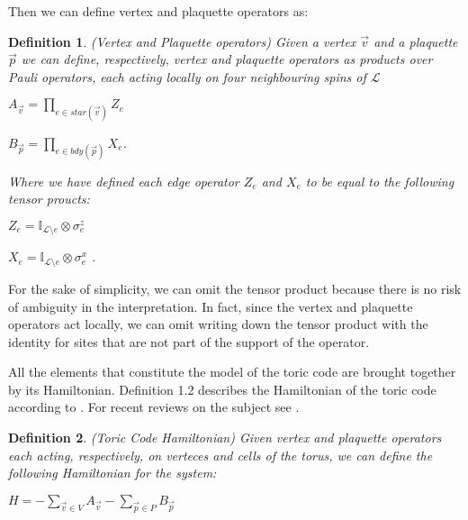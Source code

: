 \documentclass{Configuration_Files/PoliMi3i_thesis}
\newtheorem{definition}{Definition}[chapter]
\begin{document}
Then we can define vertex and plaquette operators as:

\begin{definition} (Vertex and Plaquette operators) Given a vertex $\vec{v}$ and a plaquette $\vec{p}$ we can define, respectively, vertex and plaquette operators as products over Pauli operators, each acting locally on four neighbouring spins of $\mathcal{L}$
	
\begin{center}
	$ A_{\vec{v}} = \prod_{e \in star(\vec{v})} Z_e $ 
	
	$ B_{\vec{p}} = \prod_{e \in bdy(\vec{p})} X_e $.
\end{center}

Where we have defined each edge operator $Z_e$ and $X_e$ to be equal to the following tensor proucts:

\begin{center}
	
	$Z_e = \mathbb{I}_{\mathcal{L} \setminus  e} \otimes \sigma^z_{e}$ 
	
	$X_e = \mathbb{I}_{\mathcal{L} \setminus  e} \otimes \sigma^x_{e} $ .
	
\end{center}
\end{definition}

For the sake of simplicity, we can omit the tensor product because there is no risk of ambiguity in the interpretation. In fact, since the vertex and plaquette operators act locally, we can omit writing down the tensor product with the identity for sites that are not part of the support of the operator. 
 



All the elements that constitute the model of the toric code are brought together by its Hamiltonian. Definition 1.2 describes the Hamiltonian of the toric code 
{according to \cite{Kit02}}. For recent reviews on the subject see \cite{Her20}.

\begin{definition} (Toric Code Hamiltonian) Given vertex and plaquette operators each acting, respectively, on verteces and cells of the torus, we can define the following Hamiltonian for the system:
\end{definition}

\begin{center}
	
	$H = -\sum_{\vec{v} \in V}
	A_{\vec{v}} - \sum_{\vec{p} \in P} B_{\vec{p}} $
	
\end{center}
\end{document}
